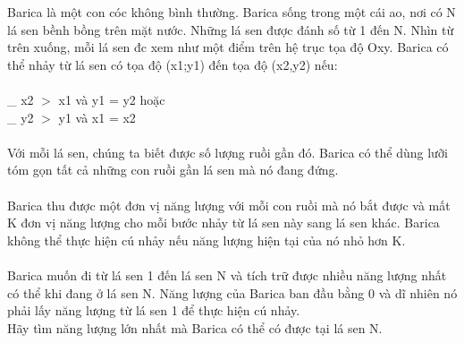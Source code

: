 Barica là một con cóc không bình thường. Barica sống trong một cái ao, nơi có N lá sen bềnh bồng trên mặt nước. Những lá sen được đánh số từ 1 đến N. Nhìn từ trên xuống, mỗi lá sen đc xem như một điểm trên hệ trục tọa độ Oxy. Barica có thể nhảy từ lá sen có tọa độ (x1;y1) đến tọa độ (x2,y2) nếu:   
\\
\\   \_ x2 $>$ x1 và y1 = y2 hoặc   
\\   \_ y2 $>$ y1 và x1 = x2   
\\
\\   Với mỗi  lá sen, chúng ta biết được số lượng ruồi gần đó. Barica có thể dùng lưỡi tóm gọn tất cả những con ruồi gần lá sen mà nó đang đứng.   
\\
\\   Barica thu được một đơn vị năng lượng với mỗi con ruồi mà nó bắt được và mất K đơn vị năng lượng cho mỗi bước nhảy từ lá sen này sang lá sen khác. Barica không thể thực hiện cú nhảy nếu năng lượng hiện tại của nó nhỏ hơn K.   
\\
\\   Barica muốn đi từ lá sen 1 đến lá sen N và tích trữ được nhiều năng lượng nhất có thể khi đang ở lá sen N. Năng lượng của Barica ban đầu bằng 0 và dĩ nhiên nó phải lấy năng lượng từ lá sen 1 để thực hiện cú nhảy.   
\\   Hãy tìm năng lượng lớn nhất mà Barica có thể có được tại lá sen N.